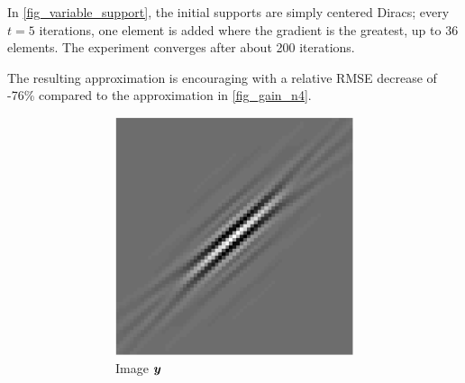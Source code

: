 In \cref{fig_variable_support}, the initial supports are simply centered Diracs; every $t=5$ iterations, one element is added where the gradient is the greatest, up to 36 elements. The experiment converges after about 200 iterations.

The resulting approximation is encouraging with a relative RMSE decrease of -76\% compared to the approximation in \cref{fig_gain_n4}.

\begin{figure}[!ht]\centering
\begin{subfigure}[b]{0.3\textwidth}\centering
	\begin{subfigure}[b]{1\textwidth}\centering
	\includegraphics[width=\textwidth]{figures/variable_support/xp_128x128_sc2_angl1_K3_S3_node4_variable_target.pdf}
	\caption{Image $\bm{y}$}
	\end{subfigure}
	\begin{subfigure}[b]{1\textwidth}\centering

\end{subfigure}
\end{subfigure}
\end{figure}
